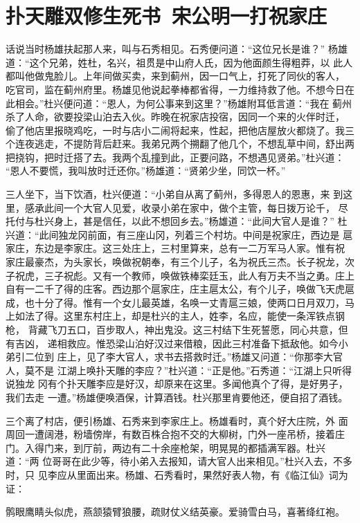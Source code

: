\chapter{扑天雕双修生死书~宋公明一打祝家庄}

话说当时杨雄扶起那人来，叫与石秀相见。石秀便问道：“这位兄长是谁？”
杨雄道：“这个兄弟，姓杜，名兴，祖贯是中山府人氏，因为他面颜生得粗莽，以
此人都叫他做鬼脸儿。上年间做买卖，来到蓟州，因一口气上，打死了同伙的客人，
吃官司，监在蓟州府里。杨雄见他说起拳棒都省得，一力维持救了他。不想今日在
此相会。”杜兴便问道：“恩人，为何公事来到这里？”杨雄附耳低言道：“我在
蓟州杀了人命，欲要投梁山泊去入伙。昨晚在祝家店投宿，因同一个来的火伴时迁，
偷了他店里报晓鸡吃，一时与店小二闹将起来，性起，把他店屋放火都烧了。我三
个连夜逃走，不提防背后赶来。我弟兄两个搠翻了他几个，不想乱草中间，舒出两
把挠钩，把时迁搭了去。我两个乱撞到此，正要问路，不想遇见贤弟。”杜兴道：
“恩人不要慌，我叫放时迁还你。”杨雄道：“贤弟少坐，同饮一杯。”

三人坐下，当下饮酒，杜兴便道：“小弟自从离了蓟州，多得恩人的恩惠，来
到这里，感承此间一个大官人见爱，收录小弟在家中，做个主管，每日拨万论千，
尽托付与杜兴身上，甚是信任，以此不想回乡去。”杨雄道：“此间大官人是谁？”
杜兴道：“此间独龙冈前面，有三座山冈，列着三个村坊。中间是祝家庄，西边是
扈家庄，东边是李家庄。这三处庄上，三村里算来，总有一二万军马人家。惟有祝
家庄最豪杰，为头家长，唤做祝朝奉，有三个儿子，名为祝氏三杰。长子祝龙，次
子祝虎，三子祝彪。又有一个教师，唤做铁棒栾廷玉，此人有万夫不当之勇。庄上
自有一二千了得的庄客。西边那个扈家庄，庄主扈太公，有个儿子，唤做飞天虎扈
成，也十分了得。惟有一个女儿最英雄，名唤一丈青扈三娘，使两口日月双刀，马
上如法了得。这里东村庄上，却是杜兴的主人，姓李，名应，能使一条浑铁点钢枪，
背藏飞刀五口，百步取人，神出鬼没。这三村结下生死誓愿，同心共意，但有吉凶，
递相救应。惟恐梁山泊好汉过来借粮，因此三村准备下抵敌他。如今小弟引二位到
庄上，见了李大官人，求书去搭救时迁。”杨雄又问道：“你那李大官人，莫不是
江湖上唤扑天雕的李应？”杜兴道：“正是他。”石秀道：“江湖上只听得说独龙
冈有个扑天雕李应是好汉，却原来在这里。多闻他真个了得，是好男子，我们去走
一遭。”杨雄便唤酒保，计算酒钱。杜兴那里肯要他还，便自招了酒钱。

三个离了村店，便引杨雄、石秀来到李家庄上。杨雄看时，真个好大庄院，外
面周回一遭阔港，粉墙傍岸，有数百株合抱不交的大柳树，门外一座吊桥，接着庄
门。入得门来，到厅前，两边有二十余座枪架，明晃晃的都插满军器。杜兴道：“两
位哥哥在此少等，待小弟入去报知，请大官人出来相见。”杜兴入去，不多时，只
见李应从里面出来。杨雄、石秀看时，果然好表人物，有《临江仙》词为证：

鹘眼鹰睛头似虎，燕颔猿臂狼腰，疏财仗义结英豪。爱骑雪白马，喜著绛红袍。

